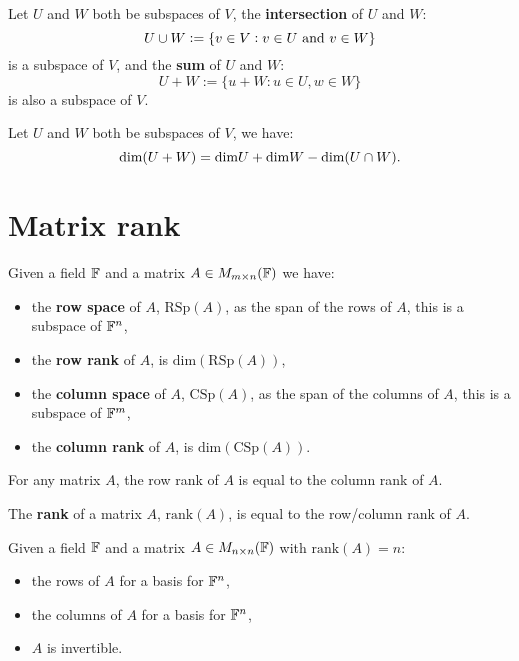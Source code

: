 \begin{definition}
    Let $U$ and $W$ both be subspaces of $V$, the \textbf{intersection} of $U$ and $W$: \[
        U\cup W := \{v\in V: v\in U  \ \text{\textcolor{black}{ and }} v\in W\}
    \]
    is a subspace of $V$, and the \textbf{sum} of $U$ and $W$: \[
        U + W := \{u + W: u\in U, w\in W\}
    \]
    is also a subspace of $V$.
\end{definition}

\begin{theorem}
    Let $U$ and $W$ both be subspaces of $V$, we have: \[
        \text{dim}(U+W)=\text{dim}U+\text{dim}W-\text{dim}(U\cap W)
    \textcolor{black}{.}
    \]
\end{theorem}

\section{Matrix rank}
\begin{definition}
    Given a field $\mathbb{F}$ and a matrix $A\in M_{m\times n}(\mathbb{F})$ we have: \begin{itemize}
        \item the \textbf{row space} of $A$, $\text{RSp}(A)$, as the span of the rows of $A$, this is a subspace of $\mathbb{F}^n$,
        \item the \textbf{row rank} of $A$, is $\text{dim}(\text{RSp}(A))$,
        \item the \textbf{column space} of $A$, $\text{CSp}(A)$, as the span of the columns of $A$, this is a subspace of $\mathbb{F}^m$,
        \item the \textbf{column rank} of $A$, is $\text{dim}(\text{CSp}(A))$.
    \end{itemize}
\end{definition}

\begin{theorem}
    For any matrix $A$, the row rank of $A$ is equal to the column rank of $A$.
\end{theorem}

\begin{definition}
    The \textbf{rank} of a matrix $A$, $\text{rank}(A)$, is equal to the row/column rank of $A$.
\end{definition}

 \begin{theorem}
     Given a field $\mathbb{F}$ and a matrix $A\in M_{n\times n}(\mathbb{F})$ with $\text{rank}(A)=n$: \begin{itemize}
         \item the rows of $A$ for a basis for $\mathbb{F}^n$,
         \item the columns of $A$ for a basis for $\mathbb{F}^n$,
         \item $A$ is invertible.
     \end{itemize}
 \end{theorem}


